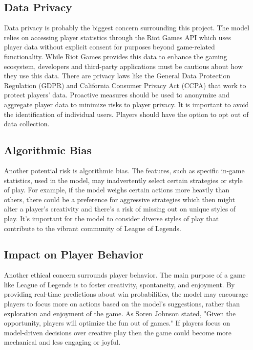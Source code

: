 \documentclass[10pt,twocolumn]{article}
\begin{document}
\subsection{Data Privacy}
Data privacy \cite{wood2004online} is probably the biggest concern surrounding this project. The model relies on accessing player statistics through the Riot Games API which uses player data without explicit consent for purposes beyond game-related functionality. While Riot Games provides this data to enhance the gaming ecosystem, developers and third-party applications must be cautious about how they use this data. There are privacy laws like the General Data Protection Regulation (GDPR) and California Consumer Privacy Act (CCPA) that work to protect players' data. Proactive measures should be used to anonymize and aggregate player data to minimize risks to player privacy. It is important to avoid the identification of individual users. Players should have the option to opt out of data collection.

\subsection{Algorithmic Bias}
Another potential risk is algorithmic bias. The features, such as specific in-game statistics, used in the model, may inadvertently select certain strategies or style of play. For example, if the model weighs certain actions more heavily than others, there could be a preference for aggressive strategies which then might alter a player's creativity and there's a risk of missing out on unique styles of play. It's important for the model to consider diverse styles of play that contribute to the vibrant community of League of Legends.

\subsection{Impact on Player Behavior}
Another ethical concern surrounds player behavior. The main purpose of a game like League of Legends is to foster creativity, spontaneity, and enjoyment. By providing real-time predictions about win probabilities, the model may encourage players to focus more on actions based on the model's suggestions, rather than exploration and enjoyment of the game. As Soren Johnson stated, "Given the opportunity, players will optimize the fun out of games." If players focus on model-driven decisions over creative play then the game could become more mechanical and less engaging or joyful.
\end{document}
